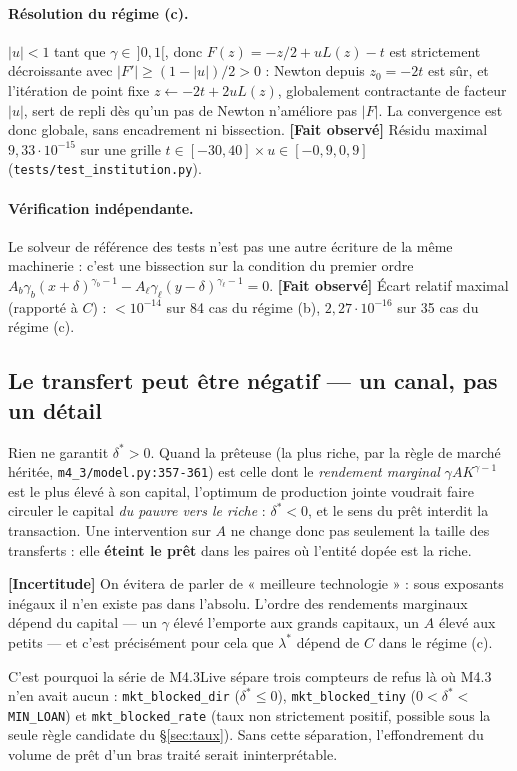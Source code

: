 \documentclass[11pt,a4paper]{article}
\newcommand{\code}[1]{\texttt{#1}}
\newcommand{\fait}{\textbf{[Fait observé]}}
\newcommand{\incertitude}{\textbf{[Incertitude]}}
\begin{document}
\paragraph{Résolution du régime (c).} $|u|<1$ tant que
$\gamma\in\,]0,1[$, donc $F(z)=-z/2+uL(z)-t$ est strictement décroissante
avec $|F'|\ge(1-|u|)/2>0$ : Newton depuis $z_0=-2t$ est sûr, et
l'itération de point fixe $z\leftarrow-2t+2uL(z)$, globalement
contractante de facteur $|u|$, sert de repli dès qu'un pas de Newton
n'améliore pas $|F|$. La convergence est donc globale, sans encadrement ni
bissection. \fait{} Résidu maximal $9{,}33\cdot10^{-15}$ sur une grille
$t\in[-30,40]\times u\in[-0{,}9,0{,}9]$
(\code{tests/test\_institution.py}).

\paragraph{Vérification indépendante.} Le solveur de référence des tests
n'est pas une autre écriture de la même machinerie : c'est une bissection
sur la condition du premier ordre
$A_b\gamma_b(x+\delta)^{\gamma_b-1}-A_\ell\gamma_\ell(y-\delta)^{\gamma_\ell-1}=0$.
\fait{} Écart relatif maximal (rapporté à $C$) : $<10^{-14}$ sur 84 cas du
régime (b), $2{,}27\cdot10^{-16}$ sur 35 cas du régime (c).

\subsection{Le transfert peut être négatif --- un canal, pas un détail}

Rien ne garantit $\delta^{*}>0$. Quand la prêteuse (la plus riche, par la
règle de marché héritée, \code{m4\_3/model.py:357-361}) est celle dont le
\emph{rendement marginal} $\gamma A K^{\gamma-1}$ est le plus élevé à son
capital, l'optimum de production jointe voudrait faire circuler le capital
\emph{du pauvre vers le riche} : $\delta^{*}<0$, et le sens du prêt interdit
la transaction. Une intervention sur $A$ ne change donc pas seulement la
taille des transferts : elle \textbf{éteint le prêt} dans les paires où
l'entité dopée est la riche.

\incertitude{} On évitera de parler de « meilleure technologie » : sous
exposants inégaux il n'en existe pas dans l'absolu. L'ordre des rendements
marginaux dépend du capital --- un $\gamma$ élevé l'emporte aux grands
capitaux, un $A$ élevé aux petits --- et c'est précisément pour cela que
$\lambda^{*}$ dépend de $C$ dans le régime (c).

C'est pourquoi la série de M4.3Live sépare trois compteurs de refus là où
M4.3 n'en avait aucun : \code{mkt\_blocked\_dir} ($\delta^{*}\le0$),
\code{mkt\_blocked\_tiny} ($0<\delta^{*}<$ \code{MIN\_LOAN}) et
\code{mkt\_blocked\_rate} (taux non strictement positif, possible sous la
seule règle candidate du §\ref{sec:taux}). Sans cette séparation,
l'effondrement du volume de prêt d'un bras traité serait ininterprétable.
\end{document}
